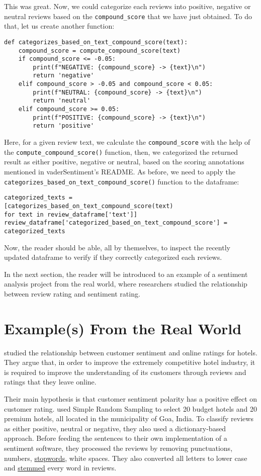 	This was great. Now, we could categorize each reviews into positive, negative or neutral reviews based on the \verb|compound_score| that we have just obtained. To do that, let us create another function:
	\begin{Verbatim}
def categorizes_based_on_text_compound_score(text):
	compound_score = compute_compound_score(text)
	if compound_score <= -0.05:
		print(f"NEGATIVE: {compound_score} -> {text}\n")
		return 'negative'
	elif compound_score > -0.05 and compound_score < 0.05:
		print(f"NEUTRAL: {compound_score} -> {text}\n")
		return 'neutral'
	elif compound_score >= 0.05:
		print(f"POSITIVE: {compound_score} -> {text}\n")
		return 'positive'
	\end{Verbatim}
	Here, for a given review text, we calculate the \verb|compound_score| with the help of the \verb|compute_compound_score()| function, then, we categorized the returned result as either positive, negative or neutral, based on the scoring annotations mentioned in vaderSentiment's README. As before, we need to apply the \verb|categorizes_based_on_text_compound_score()| function to the dataframe:
	\begin{Verbatim}
categorized_texts =
[categorizes_based_on_text_compound_score(text) 
for text in review_dataframe['text']]
review_dataframe['categorized_based_on_text_compound_score'] = 
categorized_texts
	\end{Verbatim}
	Now, the reader should be able, all by themselves, to inspect the recently updated dataframe to verify if they correctly categorized each reviews.
	
	In the next section, the reader will be introduced to an example of a sentiment analysis project from the real world, where researchers studied the relationship between review rating and sentiment rating.
	
	\section{Example(s) From the Real World}\label{sec:examplerealworld}
	\cite{geetha_relationship_2017} studied the relationship between customer sentiment and online ratings for hotels. They argue that, in order to improve the extremely competitive hotel industry, it is required to improve the understanding of its customers through reviews and ratings that they leave online.
	
	Their main hypothesis is that customer sentiment polarity has a positive effect on customer rating. \cite{geetha_relationship_2017} used Simple Random Sampling to select 20 budget hotels and 20 premium hotels, all located in the municipality of Goa, India. To classify reviews as either positive, neutral or negative, they also used a dictionary-based approach. Before feeding the sentences to their own implementation of a sentiment software, they processed the reviews by removing punctuations, numbers, \href{https://en.wikipedia.org/wiki/Stop_words}{stopwords}, white spaces. They also converted all letters to lower case and \href{https://en.wikipedia.org/wiki/Stemming}{stemmed} every word in reviews.
		
